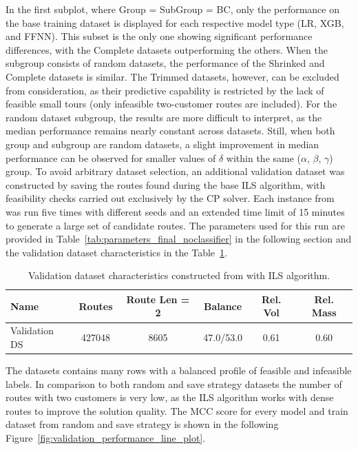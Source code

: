 In the first subplot, where Group = SubGroup = BC, only the performance on the base training dataset is
displayed for each respective model type (\gls{LR}, XGB, and \gls{FFNN}). This subset is the only one showing significant
performance differences, with the Complete datasets outperforming the others. When the subgroup consists of random datasets,
the performance of the Shrinked and Complete datasets is similar. The Trimmed datasets, however, can be excluded from consideration,
as their predictive capability is restricted by the lack of feasible small tours (only infeasible two-customer routes are included).
For the random dataset subgroup, the results are more difficult to interpret, as the median performance remains nearly constant
across datasets. Still, when both group and subgroup are random datasets, a slight improvement in median performance can
be observed for smaller values of $\delta$ within the same ($\alpha$, $\beta$, $\gamma$) group. To avoid arbitrary dataset
selection, an additional validation dataset was constructed by saving the routes found during the base \gls{ILS} algorithm,
with feasibility checks carried out exclusively by the \gls{CP} solver. Each instance from \gendreauDataSetText was run
five times with different seeds and an extended time limit of 15 minutes to generate a large set of candidate routes.
The parameters used for this run are provided in Table~\ref{tab:parameters_final_noclassifier} in the following section and
the validation dataset characteristics in the Table~\ref{tab:validation_dataset_gendreau}.
\begin{table}[!h]
    \centering
    \small
    \begin{tabular}{l c c c c c }
        \toprule
        Name          & Routes & Route Len = 2 & Balance   & Rel. Vol & Rel. Mass \\
        \midrule
        Validation DS & 427048 & 8605          & 47.0/53.0 & 0.61     & 0.60      \\
        \bottomrule
    \end{tabular}
    \caption{Validation dataset characteristics constructed from \gendreauDataSetText with ILS algorithm.}
    \label{tab:validation_dataset_gendreau}
\end{table}

The datasets contains many rows with a balanced profile of feasible and infeasible labels. In comparison to both
random and save strategy datasets the number of routes with two customers is very low, as the \gls{ILS} algorithm
works with dense routes to improve the solution quality. The \gls{MCC} score for every model and train dataset
from random and save strategy is shown in the following Figure~\ref{fig:validation_performance_line_plot}.

